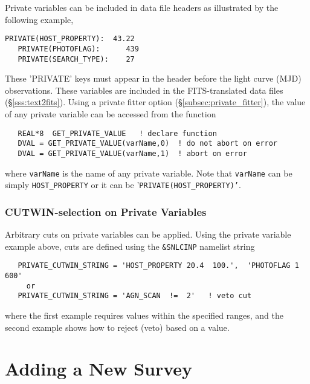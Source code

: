 \documentclass[12pt]{article}
\begin{document}
Private variables can be included in data file headers as 
illustrated by the following example,
%
\begin{Verbatim}[frame=single]
   PRIVATE(HOST_PROPERTY):  43.22
   PRIVATE(PHOTOFLAG):      439
   PRIVATE(SEARCH_TYPE):    27
\end{Verbatim}
%
These 'PRIVATE' keys must appear in the header before
the light curve (MJD) observations. These variables
are included in the FITS-translated data files
(\S\ref{sss:text2fits}). 
Using a private fitter option
(\S\ref{subsec:private_fitter}),
the value of any private variable can be accessed
from the function
\begin{verbatim}
   REAL*8  GET_PRIVATE_VALUE   ! declare function
   DVAL = GET_PRIVATE_VALUE(varName,0)  ! do not abort on error
   DVAL = GET_PRIVATE_VALUE(varName,1)  ! abort on error
\end{verbatim}
%
where {\tt varName} is the name of any private variable.
Note that {\tt varName} can be simply {\tt HOST\_PROPERTY}
or it can be '{\tt PRIVATE(HOST\_PROPERTY)'}.

\subsubsection{CUTWIN-selection on Private Variables}
\label{sss:private_cuts}

Arbitrary cuts on private variables can be applied. Using the
private variable example above, cuts are defined using the
{\tt \&SNLCINP} namelist string 
%
\begin{verbatim}
   PRIVATE_CUTWIN_STRING = 'HOST_PROPERTY 20.4  100.',  'PHOTOFLAG 1 600'
     or
   PRIVATE_CUTWIN_STRING = 'AGN_SCAN  !=  2'   ! veto cut
\end{verbatim}
%
where the first example requires values within the specified ranges,
and the second example shows how to reject (veto) based on a value.


   \clearpage
   \section{Adding a New Survey }
   \label{sec:newsurvey}
\end{document}
